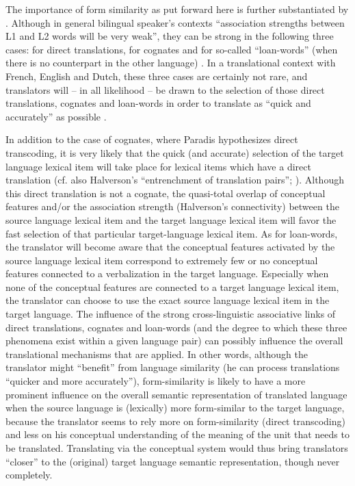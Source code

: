 The importance of form similarity as put forward here is further substantiated by \citet[140]{heredia_bilingual_2014}. Although in general bilingual speaker’s contexts “association strengths between L1 and L2 words will be very weak”, they can be strong in the following three cases: for direct translations, for cognates and for so-called “loan-words” (when there is no counterpart in the other language) \citep[141]{heredia_bilingual_2014}. In a translational context with French, English and Dutch, these three cases are certainly not rare, and translators will – in all likelihood – be drawn to the selection of those direct translations, cognates and loan-words in order to translate as “quick and accurately” as possible \citep{kroll_category_1994}.

In addition to the case of cognates, where Paradis hypothesizes direct transcoding, it is very likely that the quick (and accurate) selection of the target language lexical item will take place for lexical items which have a direct translation (cf. also Halverson’s “entrenchment of translation pairs”; \citeyear[15]{de_sutter_developing_2017}). Although this direct translation is not a cognate, the quasi-total overlap of conceptual features and\slash or the association strength (Halverson’s connectivity) between the source language lexical item and the target language lexical item will favor the fast selection of that particular target-language lexical item. As for loan-words, the translator will become aware that the conceptual features activated by the source language lexical item correspond to extremely few or no conceptual features connected to a verbalization in the target language. Especially when none of the conceptual features are connected to a target language lexical item, the translator can choose to use the exact source language lexical item in the target language. The influence of the strong cross-linguistic associative links of direct translations, cognates and loan-words (and the degree to which these three phenomena exist within a given language pair) can possibly influence the overall translational mechanisms that are applied. In other words, although the translator might ``benefit'' from language similarity (he can process translations ``quicker and more accurately''), form-similarity is likely to have a more prominent influence on the overall semantic representation of translated language when the source language is (lexically) more form-similar to the target language, because the translator seems to rely more on form-similarity (direct transcoding) and less on his conceptual understanding of the meaning of the unit that needs to be translated. Translating via the conceptual system would thus bring translators ``closer'' to the (original) target language semantic representation, though never completely.

